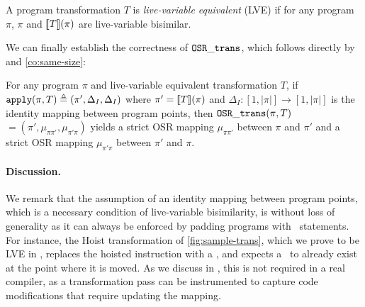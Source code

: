 \begin{definition}
\label{de:lve-trans}
A program transformation $T$ is {\em live-variable equivalent} (LVE) if for any program $\pi$, $\pi$ and $[\![T]\!](\pi)$ are live-variable bisimilar.
\end{definition}

\noindent We can finally establish the correctness of ${\tt OSR\_trans}$, which follows directly by  and \ref{co:same-size}:

\begin{theorem}
\label{th:osr-trans-correctness}
For any program $\pi$ and live-variable equivalent transformation $T$, if ${\tt apply}(\pi,T)\triangleq(\pi', \Delta_I, \Delta_I)$ where $\pi'=[\![T]\!](\pi)$ and $\Delta_I:[1,|\pi|]\rightarrow [1,|\pi|]$ is the identity mapping between program points, then ${\tt OSR\_trans}(\pi,T)$ $=(\pi',\mu_{\pi\pi'},\mu_{\pi'\pi})$ yields a strict OSR mapping $\mu_{\pi\pi'}$ between $\pi$ and $\pi'$ and a strict OSR mapping $\mu_{\pi'\pi}$ between $\pi'$ and $\pi$.
\end{theorem}

\paragraph*{Discussion.} We remark that the assumption of an identity mapping between program points, which is a necessary condition of live-variable bisimilarity, is without loss of generality as it can  always be enforced by padding programs with \wskip\ statements. For instance, the Hoist transformation of \myfigure\ref{fig:sample-trans}, which we prove to be LVE in \missing, replaces the hoisted instruction with a \wskip, and expects a \wskip\ to already exist at the point where it is moved. As we discuss in \missing, this is not required in a real compiler, as a transformation pass can be instrumented to capture code modifications that require updating the mapping.
